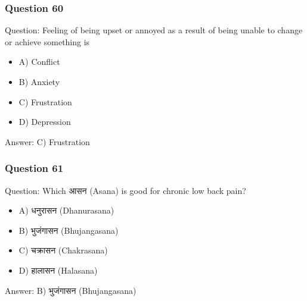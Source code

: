 \begin{frame}[fragile]\frametitle{Question 60}
Question: Feeling of being upset or annoyed as a result of being unable to change or achieve something is
\begin{itemize}
\item A) Conflict
\item B) Anxiety
\item C) Frustration
\item D) Depression
\end{itemize}
Answer: C) Frustration
\end{frame}

\begin{frame}[fragile]\frametitle{Question 61}
Question: Which आसन (Asana) is good for chronic low back pain?
\begin{itemize}
\item A) धनुरासन (Dhanurasana)
\item B) भुजंगासन (Bhujangasana)
\item C) चक्रासन (Chakrasana)
\item D) हालासन (Halasana)
\end{itemize}
Answer: B) भुजंगासन (Bhujangasana)
\end{frame}

